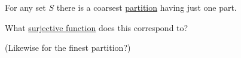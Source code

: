 
For any set $S$ there is a coarsest \href{doc/1 math/Seven Sketches in Compositionality/1 Generative Effects/2 What is order/Partition}{partition} having just one part.

What \href{doc/1 math/Seven Sketches in Compositionality/1 Generative Effects/2 What is order/Function}{surjective function} does this correspond to?

(Likewise for the finest partition?)